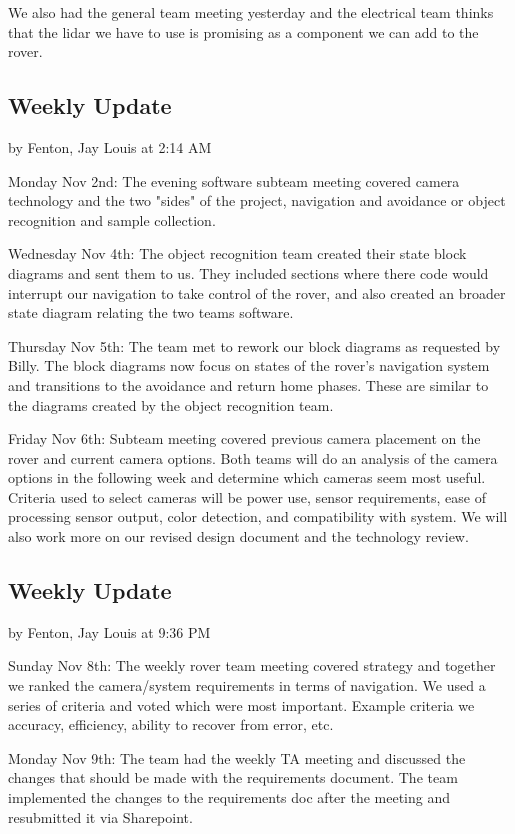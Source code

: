 \documentclass[10pt, oneside,onecolumn]{IEEEtran}
\begin{document}
\begin{titlepage}
We also had the general team meeting yesterday and the electrical team thinks that the lidar we have to use is promising as a component we can add to the rover.

\subsection{Weekly Update}
by Fenton, Jay Louis at 2:14 AM

Monday Nov 2nd: The evening software subteam meeting covered camera technology and the two "sides" of the project, navigation and avoidance or object recognition and sample collection. 

Wednesday Nov 4th: The object recognition team created their state block diagrams and sent them to us. They included sections where there code would interrupt our navigation to take control of the rover, and also created an broader state diagram relating the two teams software. 

Thursday Nov 5th: The team met to rework our block diagrams as requested by Billy. The block diagrams now focus on states of the rover's navigation system and transitions to the avoidance and return home phases. These are similar to the diagrams created by the object recognition team.

Friday Nov 6th: Subteam meeting covered previous camera placement on the rover and current camera options. Both teams will do an analysis of the camera options in the following week and determine which cameras seem most useful. Criteria used to select cameras will be power use, sensor requirements, ease of processing sensor output, color detection, and compatibility with system. We will also work more on our revised design document and the technology review. 

\subsection{Weekly Update}
by Fenton, Jay Louis at 9:36 PM

Sunday Nov 8th: The weekly rover team meeting covered strategy and together we ranked the camera/system requirements in terms of navigation. We used a series of criteria and voted which were most important. Example criteria we accuracy, efficiency, ability to recover from error, etc. 

Monday Nov 9th: The team had the weekly TA meeting and discussed the changes that should be made with the requirements document. The team implemented the changes to the requirements doc after the meeting and resubmitted it via Sharepoint.


\end{titlepage}
\end{document}
